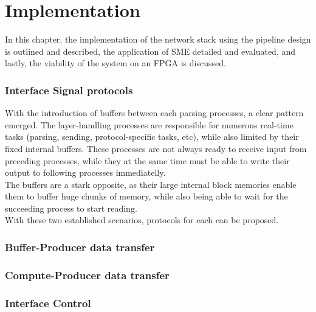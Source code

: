 \chapter{Implementation}
\label{chap:implementation}
In this chapter, the implementation of the network stack using the pipeline
design is outlined and described, the application of SME detailed and evaluated,
and lastly, the viability of the system on an FPGA is discussed.\\



\subsection{Interface Signal protocols}
\label{sec:interface_signal_protocol}
With the introduction of buffers between each parsing processes, a clear pattern
emerged. The layer-handling processes are responsible for numerous real-time tasks 
(parsing, sending, protocol-specific tasks, etc), while also limited by their 
fixed internal buffers. These processes are not always ready to receive input 
from preceding processes, while they at the same time must be able to write their
output to following processes immediatelly.\\
The buffers are a stark opposite, as their large internal block memories enable
them to buffer huge chunks of memory, while also being able to wait for the 
succeeding process to start reading.\\
With these two established scenarios, protocols for each can be proposed.  

\subsection{Buffer-Producer data transfer}

\subsection{Compute-Producer data transfer}

\subsection{Interface Control}
